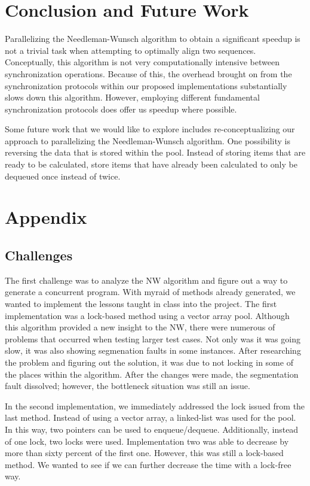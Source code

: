 \documentclass[letterpaper, 10 pt, conference]{IEEEconf}
\begin{document}
\section{Conclusion and Future Work}
Parallelizing the Needleman-Wunsch algorithm to obtain a significant speedup is not a trivial task when attempting to optimally align two sequences. Conceptually, this algorithm is not very computationally intensive between synchronization operations. Because of this, the overhead brought on from the synchronization protocols within our proposed implementations substantially slows down this algorithm. However, employing different fundamental synchronization protocols does offer us speedup where possible. 

Some future work that we would like to explore includes re-conceptualizing our approach to parallelizing the Needleman-Wunsch algorithm. One possibility is reversing the data that is stored within the pool. Instead of storing items that are ready to be calculated, store items that have already been calculated to only be dequeued once instead of twice. 

\section{Appendix}
\subsection{Challenges}
The first challenge was to analyze the NW algorithm and figure out a way to generate a concurrent program. With myraid of methods already generated, we wanted to implement the lessons taught in class into the project. The first implementation was a lock-based method using a vector array pool. Although this algorithm provided a new insight to the NW, there were numerous of problems that occurred when testing larger test cases. Not only was it was going slow, it was also showing segmenation faults in some instances. After researching the problem and figuring out the solution, it was due to not locking in some of the places within the algorithm. After the changes were made, the segmentation fault dissolved; however, the bottleneck situation was still an issue. 

In the second implementation, we immediately addressed the lock issued from the last method. Instead of using a vector array, a linked-list was used for the pool. In this way, two pointers can be used to enqueue/dequeue. Additionally, instead of one lock, two locks were used. Implementation two was able to decrease by more than sixty percent of the first one. However, this was still a lock-based method. We wanted to see if we can further decrease the time with a lock-free way. 
\end{document}
